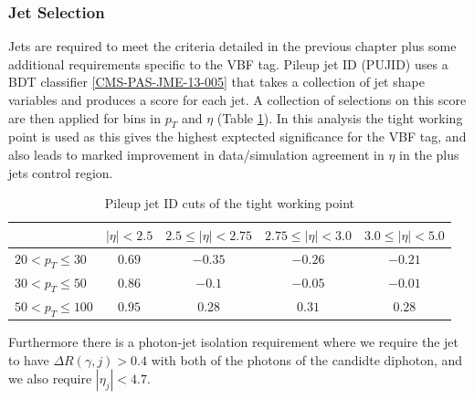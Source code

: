 \subsubsection{Jet Selection}
Jets are required to meet the criteria detailed in the previous chapter plus some additional requirements specific to the VBF tag.
Pileup jet ID (PUJID) uses a BDT classifier \ref{CMS-PAS-JME-13-005} that takes a collection of jet shape variables and produces a score for each jet. A collection of selections on this score are then applied for bins in $p_{T}$ and $\eta$ (Table \ref{tab:event_selection:tight_pujid}). In this analysis the tight working point is used as this gives the highest exptected significance for the VBF tag, and also leads to marked improvement in data/simulation agreement in $\eta$ in the \Zee plus jets control region.  
\begin{table}[h!]
    \begin{tabular}{ l || c | c | c | c }
         & $|\eta| < 2.5$ & $2.5 \leq |\eta| < 2.75$ & $2.75 \leq |\eta| < 3.0$ & $3.0 \leq |\eta| < 5.0$ \\
        \hline
        \hline
        $20 < p_{T} \leq 30$  & $0.69$ & $-0.35$ & $-0.26$ & $-0.21$ \\
        $30 < p_{T} \leq 50$  & $0.86$ & $-0.1$  & $-0.05$ & $-0.01$ \\
        $50 < p_{T} \leq 100$ & $0.95$ & $0.28$  & $0.31$  & $0.28$  \\
\end{tabular}
    \caption{Pileup jet ID cuts of the tight working point}
    \label{tab:event_selection:tight_pujid}
\end{table}
Furthermore there is a photon-jet isolation requirement where we require the jet to have $\Delta{R}(\gamma,j) > 0.4$ with both of the photons of the candidte diphoton, and we also require $|\eta_{j}| < 4.7$.







